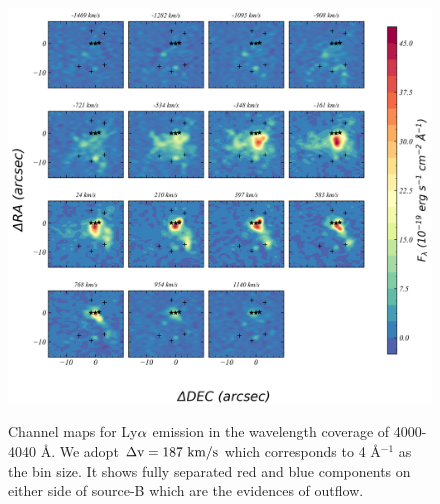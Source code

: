 \documentclass[../Results.tex]{subfiles}
\begin{document}
	\begin{figure}[htp]
		\centering
		\includegraphics[width=\textwidth]{figs/slices}
		\label{slices}
		\caption{Channel maps for Ly$\rm \alpha$ emission in the wavelength coverage of 4000-4040 \AA. We adopt $\rm \Delta v= 187 \ km/s$ which corresponds to 4 \AA$^{-1}$ as the bin size. It shows fully separated red and blue components on either side of source-B which are the evidences of outflow.}
	\end{figure}
	
\end{document}
